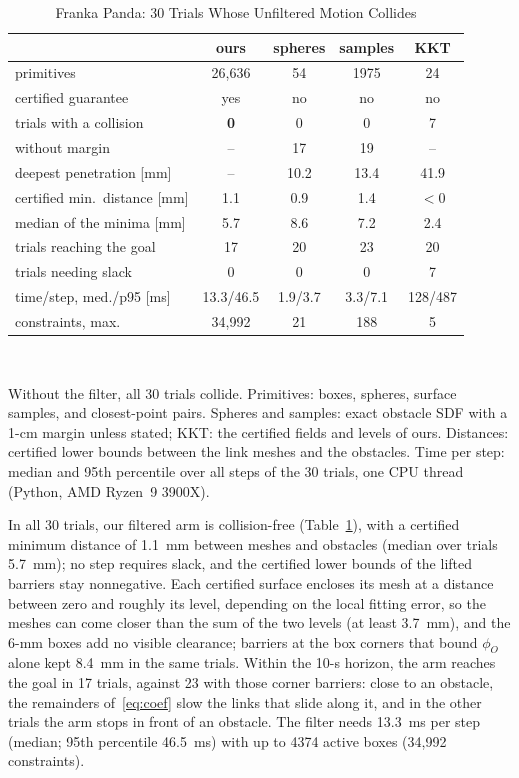 \documentclass[journal]{IEEEtran}
\theoremstyle{definition}
\newcommand{\timeFrankaMed}{13.3}\newcommand{\timeFrankaPninetyfive}{46.5}
\newcommand{\timeOurs}{13.3/46.5}\newcommand{\timeSph}{1.9/3.7}\newcommand{\timePts}{3.3/7.1}\newcommand{\timeKKT}{128/487}
\begin{document}
\begin{table}[t]
\caption{Franka Panda: 30 Trials Whose Unfiltered Motion Collides}
\label{tab:franka}
\centering
\footnotesize
\setlength{\tabcolsep}{2pt}
\renewcommand{\arraystretch}{1.05}
\begin{tabular}{lcccc}
\toprule
& ours & spheres & samples & KKT\\
\midrule
primitives & 26{,}636 & 54 & 1975 & 24\\
certified guarantee & yes & no & no & no\\
trials with a collision & \textbf{0} & 0 & 0 & 7\\
\quad without margin & -- & 17 & 19 & --\\
\quad deepest penetration [mm] & -- & 10.2 & 13.4 & 41.9\\
certified min.\ distance [mm] & 1.1 & 0.9 & 1.4 & $<0$\\
median of the minima [mm] & 5.7 & 8.6 & 7.2 & 2.4\\
trials reaching the goal & 17 & 20 & 23 & 20\\
trials needing slack & 0 & 0 & 0 & 7\\
time/step, med./p95 [ms] & \timeOurs & \timeSph & \timePts & \timeKKT\\
constraints, max. & 34{,}992 & 21 & 188 & 5\\
\bottomrule
\end{tabular}
\\[3pt]
\parbox{\columnwidth}{\footnotesize Without the filter, all 30 trials collide. Primitives: boxes,
spheres, surface samples, and closest-point pairs. Spheres and samples: exact obstacle SDF with a
1-cm margin unless stated; KKT: the certified fields and levels of ours. Distances: certified lower
bounds between the link meshes and the obstacles. Time per step: median and 95th percentile over all steps of the 30 trials, one CPU thread
(Python, AMD Ryzen~9 3900X).}
\end{table}

In all 30 trials, our filtered arm is collision-free (Table~\ref{tab:franka}), with a certified
minimum distance of 1.1~mm between meshes and obstacles (median over trials 5.7~mm); no step
requires slack, and the certified lower bounds of the lifted barriers stay nonnegative. Each certified
surface encloses its mesh at a distance between zero and roughly its level, depending on the local
fitting error, so the meshes can come closer than the sum of the two levels (at least 3.7~mm), and the
6-mm boxes add no visible clearance; barriers at the box corners that
bound $\phi_O$ alone kept 8.4~mm in the same trials. Within the 10-s horizon, the arm reaches the goal in 17 trials, against
23 with those corner barriers: close to an obstacle, the remainders of~\eqref{eq:coef} slow the links
that slide along it, and in the other trials the arm stops in front of an obstacle. The filter needs
\timeFrankaMed~ms per step (median; 95th percentile \timeFrankaPninetyfive~ms) with up to 4374 active
boxes (34{,}992 constraints).
\end{document}
